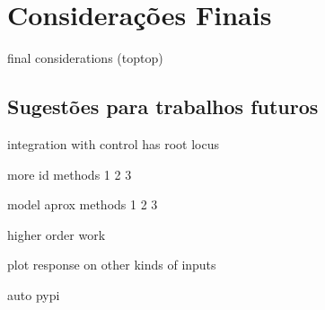 \chapter{Considerações Finais}

final considerations (toptop)

\section{Sugestões para trabalhos futuros}

integration with control has root locus

more id methods
1
2
3

model aprox methods
1
2
3

higher order work

plot response on other kinds of inputs

auto pypi

